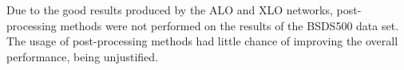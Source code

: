 Due to the good results produced by the ALO and XLO networks, post-processing methods were not performed on the results of the BSDS500 data set.
The usage of post-processing methods had little chance of improving the overall performance, being unjustified.


